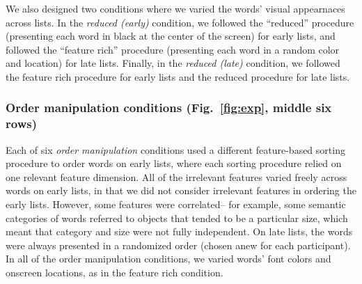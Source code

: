 \documentclass[11pt]{article}
\begin{document}
We also designed two conditions where we varied the words' visual appearnaces
across lists. In the \textit{reduced (early)} condition, we followed the
``reduced'' procedure (presenting each word in black at the center of the
screen) for early lists, and followed the ``feature rich'' procedure
(presenting each word in a random color and location) for late lists. Finally,
in the \textit{reduced (late)} condition, we followed the feature rich
procedure for early lists and the reduced procedure for late lists.

\subsubsection*{Order manipulation conditions (Fig.~\ref{fig:exp}, middle six
rows)}

Each of six \textit{order manipulation} conditions used a different
feature-based sorting procedure to order words on early lists, where each
sorting procedure relied on one relevant feature dimension. All of the
irrelevant features varied freely across words on early lists, in that we did
not consider irrelevant features in ordering the early lists. However, some
features were correlated-- for example, some semantic categories of words
referred to objects that tended to be a particular size, which meant that
category and size were not fully independent. On late lists, the words were
always presented in a randomized order (chosen anew for each participant). In
all of the order manipulation conditions, we varied words' font colors and
onscreen locations, as in the feature rich condition.
\end{document}
